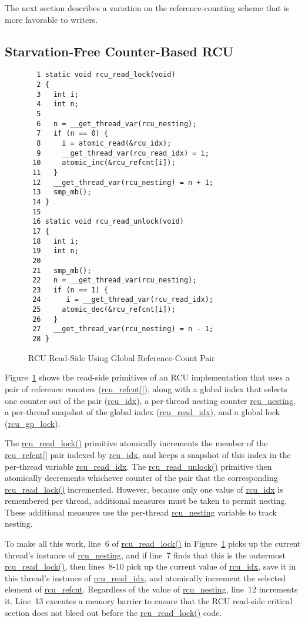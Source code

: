 The next section describes a variation on the reference-counting
scheme that is more favorable to writers.

\subsection{Starvation-Free Counter-Based RCU}
\label{app:rcuimpl:Starvation-Free Counter-Based RCU}

\begin{figure}[tbp]
{ \scriptsize
\begin{verbatim}
  1 static void rcu_read_lock(void)
  2 {
  3   int i;
  4   int n;
  5 
  6   n = __get_thread_var(rcu_nesting);
  7   if (n == 0) {
  8     i = atomic_read(&rcu_idx);
  9     __get_thread_var(rcu_read_idx) = i;
 10     atomic_inc(&rcu_refcnt[i]);
 11   }
 12   __get_thread_var(rcu_nesting) = n + 1;
 13   smp_mb();
 14 }
 15 
 16 static void rcu_read_unlock(void)
 17 {
 18   int i;
 19   int n;
 20 
 21   smp_mb();
 22   n = __get_thread_var(rcu_nesting);
 23   if (n == 1) {
 24      i = __get_thread_var(rcu_read_idx);
 25     atomic_dec(&rcu_refcnt[i]);
 26   }
 27   __get_thread_var(rcu_nesting) = n - 1;
 28 }
\end{verbatim}
}
\caption{RCU Read-Side Using Global Reference-Count Pair}
\label{fig:app:rcuimpl:RCU Read-Side Using Global Reference-Count Pair}
\end{figure}

Figure~\ref{fig:app:rcuimpl:RCU Read-Side Using Global Reference-Count Pair}
shows the read-side primitives of an RCU implementation that uses a pair
of reference counters (\url{rcu_refcnt[]}),
along with a global index that
selects one counter out of the pair (\url{rcu_idx}),
a per-thread nesting counter \url{rcu_nesting},
a per-thread snapshot of the global index (\url{rcu_read_idx}),
and a global lock (\url{rcu_gp_lock}).

The \url{rcu_read_lock()} primitive atomically increments the member of the
\url{rcu_refcnt[]} pair indexed by \url{rcu_idx}, and keeps a
snapshot of this index in the per-thread variable \url{rcu_read_idx}.
The \url{rcu_read_unlock()} primitive then atomically decrements
whichever counter of the pair that the corresponding \url{rcu_read_lock()}
incremented.
However, because only one value of \url{rcu_idx} is remembered per thread,
additional measures must be taken to permit nesting.
These additional measures use the per-thread \url{rcu_nesting} variable
to track nesting.

To make all this work, line~6 of \url{rcu_read_lock()} in
Figure~\ref{fig:app:rcuimpl:RCU Read-Side Using Global Reference-Count Pair}
picks up the
current thread's instance of \url{rcu_nesting}, and if line~7 finds
that this is the outermost \url{rcu_read_lock()},
then lines~8-10 pick up the current value of
\url{rcu_idx}, save it in this thread's instance of \url{rcu_read_idx},
and atomically increment the selected element of \url{rcu_refcnt}.
Regardless of the value of \url{rcu_nesting}, line~12 increments it.
Line~13 executes a memory barrier to ensure that the RCU read-side
critical section does not bleed out before the \url{rcu_read_lock()} code.

